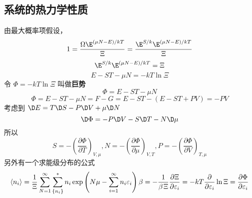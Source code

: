 \subsection{系统的热力学性质}
由最大概率项假设，
\begin{equation}
1 = \frac{{\Omega {\E^{{{\left( {\mu N - E} \right)} \mathord{\left/
 {\vphantom {{\left( {\mu N - E} \right)} {kT}}} \right.
 \kern-\nulldelimiterspace} {kT}}}}}}{\Xi } = \frac{{{\E^{S/k}}{\E^{{{\left( {\mu N - E} \right)} \mathord{\left/
 {\vphantom {{\left( {\mu N - E} \right)} {kT}}} \right.
 \kern-\nulldelimiterspace} {kT}}}}}}{\Xi }
\end{equation}
\begin{equation} 
 {\E^{S/k}}{\E^{{{\left( {\mu N - E} \right)} \mathord{\left/
 {\vphantom {{\left( {\mu N - E} \right)} {kT}}} \right.
 \kern-\nulldelimiterspace} {kT}}}} = \Xi 
\end{equation}
\begin{equation} 
 E - ST - \mu N =  - kT\ln \Xi
\end{equation}
令 $\Phi  =  - kT\ln \Xi $ 叫做\textbf{巨势}
\begin{equation}
 \Phi  = E - ST - \mu N
\end{equation}
\begin{equation}
\Phi  = E - ST - \mu N = F - G = E - ST - (E - ST + PV) =  - PV
\end{equation}
考虑到 $ \D E = T\D S - P\D V + \mu \D N$
\begin{equation}
\D \Phi  =  - P\D V - S\D T - N\D \mu
\end{equation}
所以
\begin{equation}
S =  - {\left( {\frac{{\partial \Phi }}{{\partial T}}} \right)_{V,\mu }} , N =  - {\left( {\frac{{\partial \Phi }}{{\partial \mu }}} \right)_{V,T}} , P =  - {\left( {\frac{{\partial \Phi }}{{\partial V}}} \right)_{T,\mu }}
\end{equation}
另外有一个求能级分布的公式
\begin{equation}
\left\langle {{n_i}} \right\rangle  = \frac{1}{\Xi }\sum\limits_{N = 1}^\infty  {\sum\limits_{\{ {n_i}\} }^ *  {{n_i}\exp \left( {N\mu  - \sum\limits_{i = 1}^\infty  {{n_i}{\varepsilon _i}} } \right)\beta } }  =  - \frac{1}{{\beta {\kern 1pt} \Xi }}\frac{{\partial \Xi }}{{\partial {\varepsilon _i}}} =  - kT\frac{\partial }{{\partial {\varepsilon _i}}}\ln \Xi  = \frac{{\partial \Phi }}{{\partial {\varepsilon _i}}}
\end{equation}